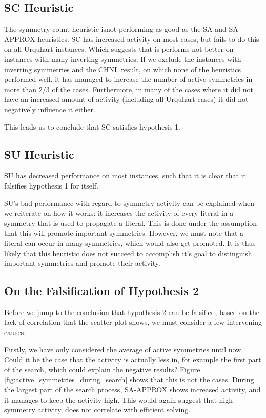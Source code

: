 \subsection{SC Heuristic}
	The symmetry count heuristic isnot performing as good as the SA and SA-APPROX heuristics.
	SC has increased activity on most cases, but fails to do this on all Urquhart instances.
	Which suggests that is performs not better on instances with many inverting symmetries.
	If we exclude the instances with inverting symmetries and the CHNL result, on which none of the
	heuristics performed well, it has managed to increase the number of active symmetries in more
	than $2/3$ of the cases.
	Furthermore, in many of the cases where it did not have an increased amount of activity
	(including all Urquhart cases) it did not negatively influence it either.

	This leads us to conclude that SC satisfies hypothesis 1.

\subsection{SU Heuristic}
	SU has decreased performance on most instances, such that it is clear that it falsifies
	hypothesis 1 for itself.

	SU's bad performance with regard to symmetry activity can be explained when we reiterate on
	how it works: it increases the activity of every literal in a symmetry that is used to propagate
	a literal.
	This is done under the assumption that this will promote important symmetries.
	However, we must note that a literal can occur in many symmetries, which would also get
	promoted.
	It is thus likely that this heuristic does not succeed to accomplish it's goal to distinguish
	important symmetries and promote their activity.

\subsection{On the Falsification of Hypothesis 2}
\label{ssec:falsification_hyp_2}

	Before we jump to the conclusion that hypothesis 2 can be falsified, based on the lack of
	correlation that the scatter plot shows, we must consider a few intervening causes.

	Firstly, we have only considered the average of active symmetries until now.
	Could it be the case that the activity is actually less in, for example the first part of the
	search, which could explain the negative results?
	Figure \ref{fig:active_symmetries_during_search} shows that this is not the cases.
	During the largest part of the search process, SA-APPROX shows increased activity, and it
	manages to keep the activity high.
	This would again suggest that high symmetry activity, does not correlate with efficient solving.

